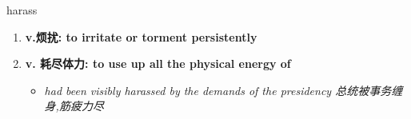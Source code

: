 
\begin{frame}
{\huge harass}
\begin{center}
\begin{enumerate}\Large
  \item \textbf{v.烦扰: to irritate or torment persistently}
  \item \textbf{v. 耗尽体力: to use up all the physical energy of}
  \begin{itemize}
    \item \em{\Large{had been visibly harassed by the demands of the presidency 总统被事务缠身,筋疲力尽}}
  \end{itemize}
\end{enumerate}
\end{center}
\end{frame}
